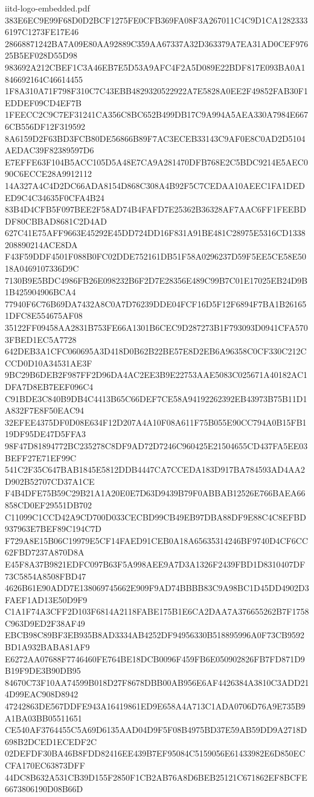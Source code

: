 \begin{filecontents*}[overwrite]{iitd-logo-embedded.pdf}
383E6EC9E99F68D0D2BCF1275FE0CFB369FA08F3A267011C4C9D1CA12823336197C1273FE17E46
28668871242BA7A09E80AA92889C359AA67337A32D363379A7EA31AD0CEF97625B5EF028D55D98
983692A212CBEF1C3A46EB7E5D53A9AFC4F2A5D089E22BDF817E093BA0A1846692164C46614455
1F8A310A71F798F310C7C43EBB4829320522922A7E5828A0EE2F49852FAB30F1EDDEF09CD4EF7B
1FEECC2C9C7EF31241CA356C8BC652B499DB17C9A994A5AEA330A7984E6676CB556DF12F319592
8A6159D2F63BD3FCB80DE56866B89F7AC3ECEB33143C9AF0E8C0AD2D5104AEDAC39F82389597D6
E7EFFE63F104B5ACC105D5A48E7CA9A281470DFB768E2C5BDC9214E5AEC090C6ECCE28A9912112
14A327A4C4D2DC66ADA8154D868C308A4B92F5C7CEDAA10AEEC1FA1DEDED9C4C34635F0CFA4B24
83B4D4CFB5F097BEE2F58AD74B4FAFD7E25362B36328AF7AAC6FF1FEEBDDF80CBBAD8681C2D4AD
627C41E75AFF9663E45292E45DD724DD16F831A91BE481C28975E5316CD1338208890214ACE8DA
F43F59DDF4501F088B0FC02DDE752161DB51F58A0296237D59F5EE5CE58E5018A0469107336D9C
7130B9E5BDC4986FB26E098232B6F2D7E28356E489C99B7C01E17025EB24D9B1B425904906BCA4
77940F6C76B69DA7432A8C0A7D76239DDE04FCF16D5F12F6894F7BA1B261651DFC8E554675AF08
35122FF09458AA2831B753FE66A1301B6CEC9D287273B1F793093D0941CFA5703FBED1EC5A7728
642DEB3A1CFC060695A3D418D0B62B22BE57E8D2EB6A96358C0CF330C212CCCD0D10A34531AE3F
9BC29B6DEB2F987FF2D96DA4AC2EE3B9E22753AAE5083C025671A40182AC1DFA7D8EB7EEF096C4
C91BDE3C840B9DB4C4413B65C66DEF7CE58A94192262392EB43973B75B11D1A832F7E8F50EAC94
32EFEE4375DF0D08E634F12D207A4A10F08A611F75B055E90CC794A0B15FB119DF95DE47D5FFA3
98F47D81894772BC235278C8DF9AD72D7246C960425E21504655CD437FA5EE03BEFF27E71EF99C
541C2F35C647BAB1845E5812DDB4447CA7CCEDA183D917BA784593AD4AA2D902B52707CD37A1CE
F4B4DFE75B59C29B21A1A20E0E7D63D9439B79F0ABBAB12526E766BAEA66858CD0EF29551DB702
C11099C1CCD42A9CD700D033CECBD99CB49EB97DBA88DF9E88C4C8EFBD937963E7BEF89C194C7D
F729A8E15B06C19979E5CF14FAED91CEB0A18A65635314246BF9740D4CF6CC62FBD7237A870D8A
E45F8A37B9821EDFC097B63F5A998AEE9A7D3A1326F2439FBD1D8310407DF73C5854A8508FBD47
4626B61E90ADD7E138069745662E909F9AD74BBBB83C9A98BC1D45DD4902D3FAEF1AD13E50D9F9
C1A1F74A3CFF2D103F6814A2118FABE175B1E6CA2DAA7A376655262B7F1758C963D9ED2F38AF49
EBCB98C89BF3EB935B8AD3334AB4252DF94956330B518895996A0F73CB9592BD1A932BABA81AF9
E6272AA07688F7746460FE764BE18DCB0096F459FB6E050902826FB7FD871D9B19F9DE3B90DB95
84670C73F10AA74599B018D27F8678DBB00AB956E6AF4426384A3810C3ADD214D99EAC908D8942
47242863DE567DDFE943A16419861ED9E658A4A713C1ADA0706D76A9E735B9A1BA03BB05511651
CE540AF3764455C5A69D6135AAD04D9F5F08B4975BD37E59AB59DD9A2718D698B2DCED1ECEDF2C
02DEFDF30BA46B8FDD82416EE439B7EF95084C5159056E61433982E6D850ECCFA170EC63873DFF
44DC8B632A531CB39D155F2850F1CB2AB76A8D6BEB25121C671862EF8BCFE6673806190D08B66D

\end{filecontents*}
